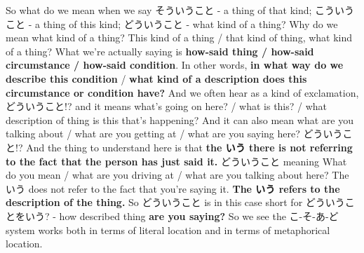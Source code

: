 {}

So what do we mean when we say そういうこと - a thing of that kind; こういうこと - a thing of this kind; どういうこと - what kind of a thing? Why do we mean what kind of a thing? This kind of a thing / that kind of thing, what kind of a thing? What we're actually saying is {\bf how-said thing / how-said circumstance / how-said condition}. In other words, {\bf in what way do we describe this condition} / {\bf what kind of a description does this circumstance or condition have?} And we often hear as a kind of exclamation, どういうこと!? and it means what's going on here? / what is this? / what description of thing is this that's happening? And it can also mean what are you talking about / what are you getting at / what are you saying here? どういうこと!? And the thing to understand here is that {\bf the いう there is not referring to the fact that the person has just said it.} どういうこと meaning What do you mean / what are you driving at / what are you talking about here? The いう does not refer to the fact that you're saying it. {\bf The いう refers to the description of the thing.} So どういうこと is in this case short for どういうことをいう? - how described thing {\bf are you saying?} So we see the こ-そ-あ-ど system works both in terms of literal location and in terms of metaphorical location.

\stopsectionlevel

\stopsectionlevel
